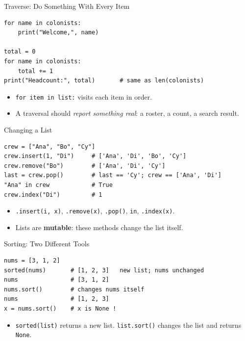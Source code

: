 \documentclass{beamer}
\begin{document}
\begin{frame}[fragile]{Traverse: Do Something With Every Item}
\begin{verbatim}
for name in colonists:
    print("Welcome,", name)

total = 0
for name in colonists:
    total += 1
print("Headcount:", total)       # same as len(colonists)
\end{verbatim}
\begin{itemize}
    \item \texttt{for item in list:} visits each item in order.
    \item A traversal should \emph{report something real}: a roster, a count, a search result.
\end{itemize}
\end{frame}

\begin{frame}[fragile]{Changing a List}
\begin{verbatim}
crew = ["Ana", "Bo", "Cy"]
crew.insert(1, "Di")     # ['Ana', 'Di', 'Bo', 'Cy']
crew.remove("Bo")        # ['Ana', 'Di', 'Cy']
last = crew.pop()        # last == 'Cy'; crew == ['Ana', 'Di']
"Ana" in crew            # True
crew.index("Di")         # 1
\end{verbatim}
\begin{itemize}
    \item \texttt{.insert(i, x)}, \texttt{.remove(x)}, \texttt{.pop()}, \texttt{in}, \texttt{.index(x)}.
    \item Lists are \textbf{mutable}: these methods change the list itself.
\end{itemize}
\end{frame}

\begin{frame}[fragile]{Sorting: Two Different Tools}
\begin{verbatim}
nums = [3, 1, 2]
sorted(nums)       # [1, 2, 3]   new list; nums unchanged
nums               # [3, 1, 2]
nums.sort()        # changes nums itself
nums               # [1, 2, 3]
x = nums.sort()    # x is None !
\end{verbatim}
\begin{itemize}
    \item \texttt{sorted(list)} returns a new list. \texttt{list.sort()} changes the list and returns \texttt{None}.
\end{itemize}
\end{frame}
\end{document}
